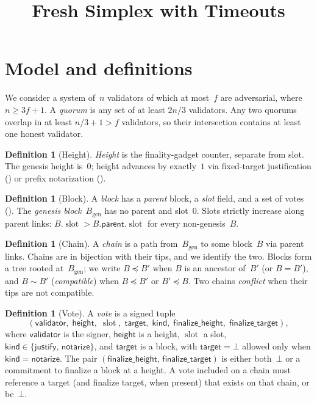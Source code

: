 \ifx\litemode\undefined\documentclass{article}\fi
\title{Fresh Simplex with Timeouts}
\newcommand{\genesis}{\ensuremath{B_{\mathrm{gen}}}}
\newcommand{\slot}[0]{\ensuremath{\operatorname{\mathrm{slot}}}}
\newcommand{\target}{\mathsf{target}}
\newcommand{\kind}{\mathsf{kind}}
\newcommand{\height}{\mathsf{height}}
\newcommand{\validator}{\mathsf{validator}}
\newcommand{\just}{\ensuremath{\mathsf{justify}}\xspace}
\newcommand{\notar}{\ensuremath{\mathsf{notarize}}\xspace}
\newcommand{\parent}{\mathsf{parent}}
\newcommand{\finalizeHeight}{\mathsf{finalize\_height}}
\newcommand{\finalizeTarget}{\mathsf{finalize\_target}}
\theoremstyle{plain}
\theoremstyle{definition}
\newtheorem{definition}[theorem]{Definition}
\theoremstyle{remark}
\begin{document}
\maketitle

\section{Model and definitions}

We consider a system of~$n$ validators of which at most~$f$ are adversarial, where $n \geq 3f + 1$.
A \emph{quorum} is any set of at least $2n/3$ validators.
Any two quorums overlap in at least $n/3 + 1 > f$ validators, so their intersection contains at least one honest validator.

\begin{definition}[Height]\label{def:height}
\emph{Height} is the finality-gadget counter, separate from slot.
The genesis height is~$0$; height advances by exactly~$1$ via fixed-target justification () or prefix notarization ().
\end{definition}

\begin{definition}[Block]\label{def:block}
A \emph{block} has a \emph{parent} block, a \emph{slot} field, and a set of votes ().
The \emph{genesis block}~$\genesis$ has no parent and slot~$0$.
Slots strictly increase along parent links: $B.\slot > B.\parent.\slot$ for every non-genesis~$B$.
\end{definition}

\begin{definition}[Chain]\label{def:chain}
A \emph{chain} is a path from~$\genesis$ to some block~$B$ via parent links.
Chains are in bijection with their tips, and we identify the two.
Blocks form a tree rooted at~$\genesis$; we write $B \preceq B'$ when $B$ is an ancestor of~$B'$ (or $B = B'$), and $B \sim B'$ (\emph{compatible}) when $B \preceq B'$ or $B' \preceq B$.
Two chains \emph{conflict} when their tips are not compatible.
\end{definition}

\begin{definition}[Vote]\label{def:vote}
A \emph{vote} is a signed tuple
\[
  (\validator,\; \height,\; \slot,\; \target,\; \kind,\; \finalizeHeight,\; \finalizeTarget),
\]
where $\validator$ is the signer, $\height$ is a height, $\slot$ a slot, $\kind \in \{\just,\, \notar\}$, and $\target$ is a block, with $\target = \bot$ allowed only when $\kind = \notar$.
The pair $(\finalizeHeight,\, \finalizeTarget)$ is either both~$\bot$ or a commitment to finalize a block at a height.
A vote included on a chain must reference a target (and finalize target, when present) that exists on that chain, or be~$\bot$.
\end{definition}
\end{document}
